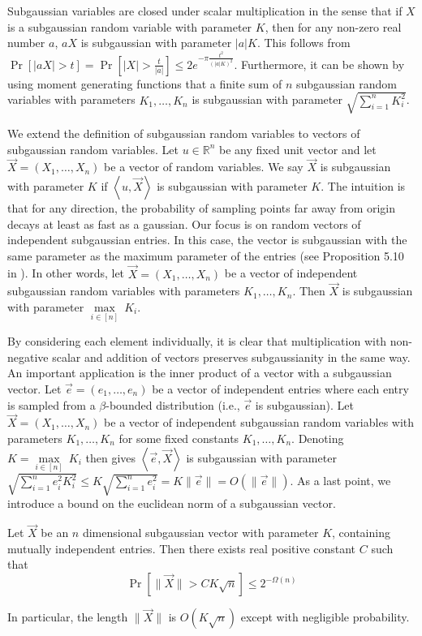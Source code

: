 Subgaussian variables are closed under scalar multiplication in the sense that if $X$ is a subgaussian random variable with parameter $K$, then for any non-zero real number $a$, $aX$ is subgaussian with parameter $|a|K$. This follows from $\operatorname{Pr}[|aX|>t] = \operatorname{Pr}[|X|>\frac{t}{|a|}] \leq 2e^{- \pi \frac{t^2}{(|a|K)^2}}$. Furthermore, it can be shown by using moment generating functions that a finite sum of $n$ subgaussian random variables with parameters $K_1, \dots, K_n$ is subgaussian with parameter $\sqrt{\sum_{i=1}^n K_i^2}$.

We extend the definition of subgaussian random variables to vectors of subgaussian random variables. Let $u \in \mathbb{R}^n$ be any fixed unit vector and let $\vec{X} = (X_1, \dots, X_n)$ be a vector of random variables. We say $\vec{X}$ is subgaussian with parameter $K$ if $\left\langle u,\vec{X} \right\rangle$ is subgaussian with parameter $K$. The intuition is that for any direction, the probability of sampling points far away from origin decays at least as fast as a gaussian. Our focus is on random vectors of independent subgaussian entries. In this case, the vector is subgaussian with the same parameter as the maximum parameter of the entries (see Proposition 5.10 in \cite{vershynin2011introduction}). In other words, let $\vec{X} = (X_1, \dots, X_n)$ be a vector of independent subgaussian random variables with parameters $K_1, \dots, K_n$. Then $\vec{X}$ is subgaussian with parameter $\underset{i \in [n]}{\max} \ K_i$.

By considering each element individually, it is clear that multiplication with non-negative scalar and addition of vectors preserves subgaussianity in the same way. An important application is the inner product of a vector with a subgaussian vector. Let $\vec{e} = (e_1, \dots, e_n)$ be a vector of independent entries where each entry is sampled from a $\beta$-bounded distribution (i.e., $\vec{e}$ is subgaussian). Let $\vec{X} = (X_1, \dots, X_n)$ be a vector of independent subgaussian random variables with parameters $K_1, \dots, K_n$ for some fixed constants $K_1, \dots, K_n$. Denoting $K = \underset{i \in [n]}{\max} \ K_i$ then gives $\left\langle \vec{e}, \vec{X} \right\rangle$ is subgaussian with parameter $\sqrt{\sum_{i=1}^n e_i^2 K_i^2} \leq K \sqrt{\sum_{i=1}^n e_i^2 } = K \| \vec{e} \| = O(\|\vec{e}\|)$. 
As a last point, we introduce a bound on the euclidean norm of a subgaussian vector.
\begin{theorem}
    Let $\vec{X}$ be an $n$ dimensional subgaussian vector with parameter $K$, containing mutually independent entries. Then there exists real positive constant $C$ such that 
    \begin{equation*}
        \operatorname{Pr}[\| \vec{X} \| > CK\sqrt{n}] \leq 2^{-\Omega(n)}
    \end{equation*}
\end{theorem}
In particular, the length $\| \vec{X}\|$ is $O(K\sqrt{n})$ except with negligible probability.

